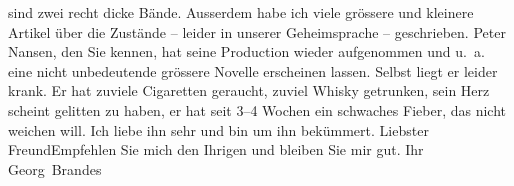 \begin{ledgroupsized}[t]{13cm}
                    sind zwei recht dicke Bände. Ausserdem habe ich viele grössere und kleinere
                    Artikel über die Zustände – leider in unserer Geheimsprache – geschrieben.\pend
           \pstart
           Peter Nansen, den Sie kennen, hat seine
                    Production wieder aufgenommen und u. a. eine nicht unbedeutende grössere Novelle erscheinen lassen.
                    Selbst liegt er leider krank. Er hat zuviele {\pb}Cigaretten geraucht, zuviel
                    Whisky getrunken, sein Herz scheint gelitten zu haben, er hat seit 3–4 Wochen
                        ein
               schwaches Fieber, das nicht weichen
                    will. Ich liebe ihn sehr und bin um ihn bekümmert.\pend
           \pstart
           Liebster Freund\hspace*{1.5em}Empfehlen Sie mich den Ihrigen
                    und bleiben Sie mir gut.\pend
           \pstart Ihr \spacefill\mbox{Georg Brandes}\pend{}
         
         \endnumbering{}\end{ledgroupsized}  \newcommand{\dateiname}{L02221}\newcommand{\titel}{Georg Brandes an Arthur Schnitzler, 4. 12. 1915}\newcommand{\editorInnen}{Martin Anton Müller und Gerd-Hermann Susen}
      